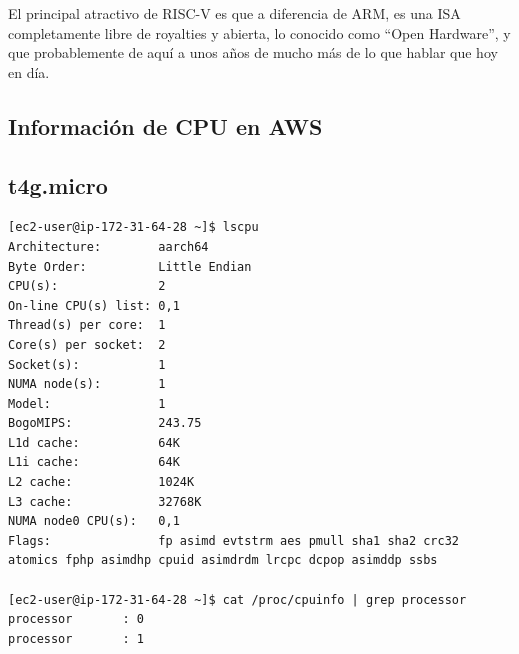 \documentclass[a4paper,openright,12pt]{article}
\begin{document}
El principal atractivo de RISC-V es que a diferencia de ARM, es una ISA completamente libre de royalties y abierta, lo conocido como ``Open Hardware'', y que probablemente de aquí a unos
años de mucho más de lo que hablar que hoy en día.


\clearpage
\begin{flushleft}
\printbibliography[]{}
\clearpage
\printglossaries
\end{flushleft}


\clearpage
\begin{appendices}
\addappheadtotoc
\appendixpage

\section{Información de CPU en AWS}\label{anexo:info_cpu_aws}
\subsection{t4g.micro}
\begin{verbatim}
[ec2-user@ip-172-31-64-28 ~]$ lscpu
Architecture:        aarch64
Byte Order:          Little Endian
CPU(s):              2
On-line CPU(s) list: 0,1
Thread(s) per core:  1
Core(s) per socket:  2
Socket(s):           1
NUMA node(s):        1
Model:               1
BogoMIPS:            243.75
L1d cache:           64K
L1i cache:           64K
L2 cache:            1024K
L3 cache:            32768K
NUMA node0 CPU(s):   0,1
Flags:               fp asimd evtstrm aes pmull sha1 sha2 crc32 atomics fphp asimdhp cpuid asimdrdm lrcpc dcpop asimddp ssbs  

[ec2-user@ip-172-31-64-28 ~]$ cat /proc/cpuinfo | grep processor
processor       : 0
processor       : 1
\end{verbatim}
\newpage

\end{appendices}
\end{document}
